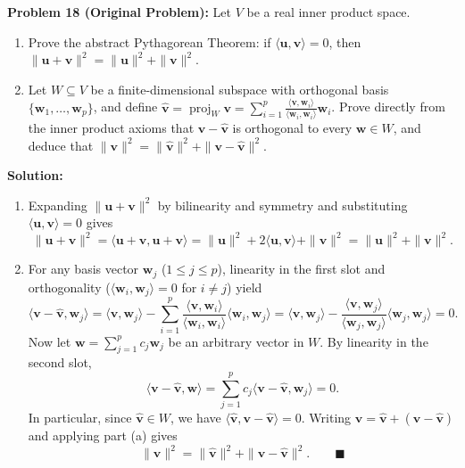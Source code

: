 \documentclass[11pt, letterpaper]{article}
\theoremstyle{definition}
\theoremstyle{remark}
\begin{document}
\textbf{Problem 18 (Original Problem):} Let $V$ be a real inner product space.
\begin{enumerate}[label=(\alph*)]
    \item Prove the abstract Pythagorean Theorem: if $\langle \mathbf{u}, \mathbf{v} \rangle = 0$, then $\|\mathbf{u} + \mathbf{v}\|^2 = \|\mathbf{u}\|^2 + \|\mathbf{v}\|^2$.
    \item Let $W \subseteq V$ be a finite-dimensional subspace with orthogonal basis $\{\mathbf{w}_1, \dots, \mathbf{w}_p\}$, and define $\hat{\mathbf{v}} = \operatorname{proj}_W \mathbf{v} = \sum_{i=1}^p \frac{\langle \mathbf{v}, \mathbf{w}_i \rangle}{\langle \mathbf{w}_i, \mathbf{w}_i \rangle}\mathbf{w}_i$. Prove directly from the inner product axioms that $\mathbf{v} - \hat{\mathbf{v}}$ is orthogonal to every $\mathbf{w} \in W$, and deduce that $\|\mathbf{v}\|^2 = \|\hat{\mathbf{v}}\|^2 + \|\mathbf{v} - \hat{\mathbf{v}}\|^2$.
\end{enumerate}

\textbf{Solution:}
\begin{enumerate}[label=(\alph*)]
    \item Expanding $\|\mathbf{u} + \mathbf{v}\|^2$ by bilinearity and symmetry and substituting $\langle \mathbf{u}, \mathbf{v} \rangle = 0$ gives
    \[
    \|\mathbf{u} + \mathbf{v}\|^2 = \langle \mathbf{u} + \mathbf{v}, \mathbf{u} + \mathbf{v} \rangle = \|\mathbf{u}\|^2 + 2\langle \mathbf{u}, \mathbf{v} \rangle + \|\mathbf{v}\|^2 = \|\mathbf{u}\|^2 + \|\mathbf{v}\|^2.
    \]
    \item For any basis vector $\mathbf{w}_j$ ($1 \le j \le p$), linearity in the first slot and orthogonality ($\langle \mathbf{w}_i, \mathbf{w}_j \rangle = 0$ for $i \neq j$) yield
    \[
    \langle \mathbf{v} - \hat{\mathbf{v}}, \mathbf{w}_j \rangle = \langle \mathbf{v}, \mathbf{w}_j \rangle - \sum_{i=1}^p \frac{\langle \mathbf{v}, \mathbf{w}_i \rangle}{\langle \mathbf{w}_i, \mathbf{w}_i \rangle}\langle \mathbf{w}_i, \mathbf{w}_j \rangle = \langle \mathbf{v}, \mathbf{w}_j \rangle - \frac{\langle \mathbf{v}, \mathbf{w}_j \rangle}{\langle \mathbf{w}_j, \mathbf{w}_j \rangle}\langle \mathbf{w}_j, \mathbf{w}_j \rangle = 0.
    \]
    Now let $\mathbf{w} = \sum_{j=1}^p c_j \mathbf{w}_j$ be an arbitrary vector in $W$. By linearity in the second slot,
    \[
    \langle \mathbf{v} - \hat{\mathbf{v}}, \mathbf{w} \rangle = \sum_{j=1}^p c_j \langle \mathbf{v} - \hat{\mathbf{v}}, \mathbf{w}_j \rangle = 0.
    \]
    In particular, since $\hat{\mathbf{v}} \in W$, we have $\langle \hat{\mathbf{v}}, \mathbf{v} - \hat{\mathbf{v}} \rangle = 0$. Writing $\mathbf{v} = \hat{\mathbf{v}} + (\mathbf{v} - \hat{\mathbf{v}})$ and applying part (a) gives
    \[
    \|\mathbf{v}\|^2 = \|\hat{\mathbf{v}}\|^2 + \|\mathbf{v} - \hat{\mathbf{v}}\|^2. \qquad \blacksquare
    \]
\end{enumerate}
\end{document}
